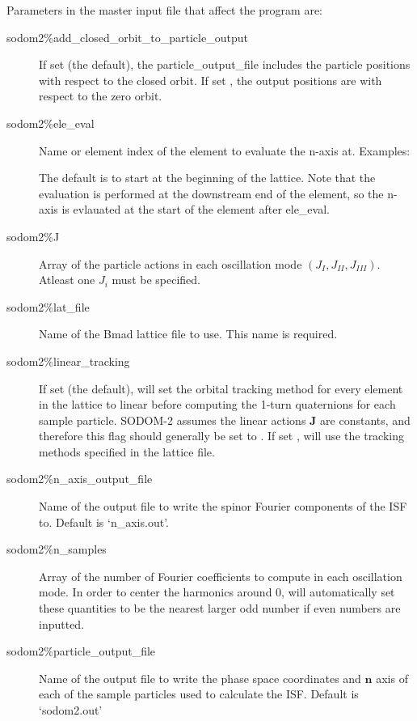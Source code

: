 \documentclass{hitec}     %
\newcommand{\sodom}{\vn{sodom2}\xspace}
\begin{document}
Parameters in the master input file that affect the program are:
\begin{description}
\item[sodom2\%add_closed_orbit_to_particle_output] \Newline
If set  (the default), the particle_output_file includes the particle positions with respect to the closed orbit. If set , the output positions are with respect to the zero orbit. 

\item[sodom2\%ele_eval] \Newline
Name or element index of the element to evaluate the n-axis at. Examples:
The default is to start at the beginning of the lattice. Note that the evaluation is performed at the downstream end of the element, so the n-axis is evlauated at the start of the element after ele_eval.

\item[sodom2\%J] \Newline
Array of the particle actions in each oscillation mode $(J_{I},J_{II},J_{III})$. Atleast one $J_i$ must be specified.

\item[sodom2\%lat_file] \Newline Name of the Bmad lattice file to use. This name is required.

\item[sodom2\%linear_tracking]\Newline
If set  (the default), \sodom will set the orbital tracking method for every element in the lattice to linear before computing the 1-turn quaternions for each sample particle. SODOM-2 assumes the linear actions $\pmb{J}$ are constants, and therefore this flag should generally be set to . If set , \sodom will use the tracking methods specified in the lattice file.

\item[sodom2\%n_axis_output_file] \Newline
Name of the output file to write the spinor Fourier components of the ISF to. Default is `n_axis.out'.

\item[sodom2\%n_samples] \Newline
Array of the number of Fourier coefficients to compute in each oscillation mode. In order to center the harmonics around 0, \sodom will automatically set these quantities to be the nearest larger odd number if even numbers are inputted.

\item[sodom2\%particle_output_file]\Newline
Name of the output file to write the phase space coordinates and $\pmb{n}$ axis of each of the sample particles used to calculate the ISF. Default is `sodom2.out'


\end{description}
\end{document}
